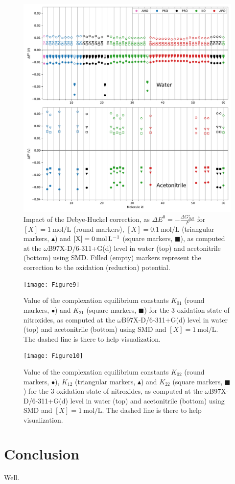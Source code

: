 \documentclass[review]{elsarticle}
\begin{document}
\begin{figure}[!h]
	\centering
	\includegraphics[width=\linewidth]{Figure8}
	\caption{Impact of the Debye-Huckel correction, as $\Delta E^0 = -\frac{\Delta G_{DH}^\star}{F}$ for $[X]=\SI{1}{\mole\per\liter}$ (round markers), $[X]=\SI{0.1}{\mole\per\liter}$ (triangular markers, $\blacktriangle$)  and $[\ce{X}]=\SI{0}{\mole\per\liter}$ (square markers, $\blacksquare$), as computed at the $\omega$B97X-D/6-311+G(d) level in water (top) and acetonitrile (bottom) using SMD. Filled (empty) markers represent the correction to the oxidation (reduction) potential. }
	\label{fig:DH}
\end{figure}


\begin{figure}[!h]
\centering
\texttt{[image: Figure9]}
\caption{Value of the complexation equilibrium constants $K_{01}$ (round markers, $\bullet$) and $K_{21}$ (square markers, $\blacksquare$) for the 3 oxidation state of nitroxides, as computed at the $\omega$B97X-D/6-311+G(d) level in water (top) and acetonitrile (bottom) using SMD and $[X]=\SI{1}{\mole\per\liter}$.  The dashed line is there to help visualization. }
\label{fig:Kx1}
\end{figure}


\begin{figure}[!h]
\centering
\texttt{[image: Figure10]}
\caption{Value of the complexation equilibrium constants $K_{02}$ (round markers, $\bullet$), $K_{12}$ (triangular markers, $\blacktriangle$) and $K_{22}$ (square markers, $\blacksquare$) for the 3 oxidation state of nitroxides, as computed at the $\omega$B97X-D/6-311+G(d) level in water (top) and acetonitrile (bottom) using SMD and $[X]=\SI{1}{\mole\per\liter}$.  The dashed line is there to help visualization. }
\label{fig:Kx2}
\end{figure}

\section{Conclusion}

Well.
	
	
 

	
\end{document}
